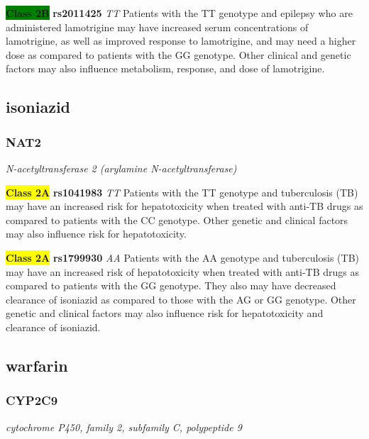 \documentclass{report}
\begin{document}
\textbf{\colorbox{green} {Class 2B}} \textbf{ rs2011425 } \textit{ TT }
Patients with the TT genotype and epilepsy who are administered lamotrigine may have increased serum concentrations of lamotrigine, as well as improved response to lamotrigine, and may need a higher dose as compared to patients with the GG genotype. Other clinical and genetic factors may also influence metabolism, response, and dose of lamotrigine.  \newline

\subsection{ isoniazid }\subsubsection{ NAT2 }
\textit{ N-acetyltransferase 2 (arylamine N-acetyltransferase) } \newline




\textbf{\colorbox{yellow} {Class 2A}} \textbf{ rs1041983 } \textit{ TT }
Patients with the TT genotype and tuberculosis (TB) may have an increased risk for hepatotoxicity when treated with anti-TB drugs as compared to patients with the CC genotype. Other genetic and clinical factors may also influence risk for hepatotoxicity.\newline

\textbf{\colorbox{yellow} {Class 2A}} \textbf{ rs1799930 } \textit{ AA }
Patients with the AA genotype and tuberculosis (TB) may have an increased risk of hepatotoxicity when treated with anti-TB drugs as compared to patients with the GG genotype. They also may have decreased clearance of isoniazid as compared to those with the AG or GG genotype. Other genetic and clinical factors may also influence risk for hepatotoxicity and clearance of isoniazid.\newline



\subsection{ warfarin }\subsubsection{ CYP2C9 }
\textit{ cytochrome P450, family 2, subfamily C, polypeptide 9 } \newline
\end{document}
